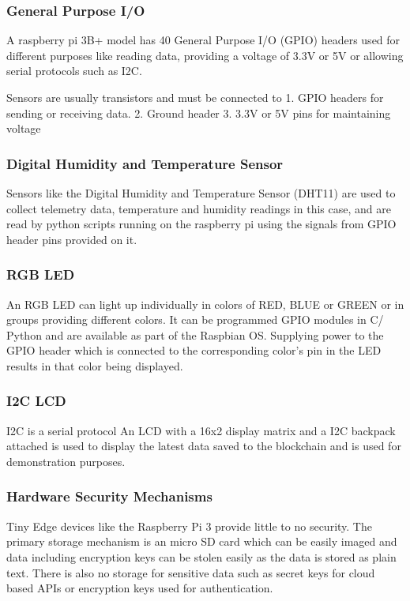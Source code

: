 \documentclass[11pt,openright]{report}
\begin{document}
\subsubsection{General Purpose I/O}
A raspberry pi 3B+ model has 40 General Purpose I/O (GPIO) headers used for different purposes like reading data, providing a voltage of 3.3V or 5V or allowing serial protocols such as I2C.

Sensors are usually transistors and must be connected to 
1. GPIO headers for sending or receiving data.
2. Ground header 
3. 3.3V or 5V pins for maintaining voltage

\subsubsection{Digital Humidity and Temperature Sensor}
Sensors like the Digital Humidity and Temperature Sensor (DHT11) are used to collect telemetry data, temperature and humidity readings in this case, and are read by python scripts running on the raspberry pi using the signals from GPIO header pins provided on it.

\subsubsection{RGB LED}
An RGB LED can light up individually in colors of RED, BLUE or GREEN or in groups providing different colors. It can be programmed GPIO modules in C/ Python and are available as part of the Raspbian OS. Supplying power to the GPIO header which is connected to the corresponding color’s pin in the LED results in that color being displayed. 

\subsubsection{I2C LCD}
I2C is a serial protocol 
An LCD with a 16x2 display matrix and a I2C backpack attached is used to display the latest data saved to the blockchain and is used for demonstration purposes. 

\subsubsection{Hardware Security Mechanisms}
Tiny Edge devices like the Raspberry Pi 3 provide little to no security.
The primary storage mechanism is an micro SD card which can be easily imaged and data including encryption keys can be stolen easily as the data is stored as plain text. There is also no storage for sensitive data such as secret keys for cloud based APIs or encryption keys used for authentication.
\end{document}
